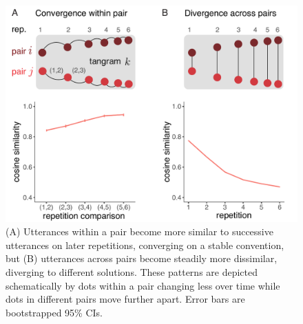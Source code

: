 \documentclass[alpha-refs]{wiley-article}
\begin{document}
\begin{figure}[t]
\centering
\includegraphics[scale=.5]{similarity_analysis.pdf}
\vspace{1em}
\caption{(A) Utterances within a pair become more similar to successive utterances on later repetitions, converging on a stable convention, but (B) utterances across pairs become steadily more dissimilar, diverging to different solutions. These patterns are depicted schematically by dots within a pair changing less over time while dots in different pairs move further apart. Error bars are bootstrapped 95\% CIs. }
\label{fig:similarity}
\end{figure}
\end{document}
